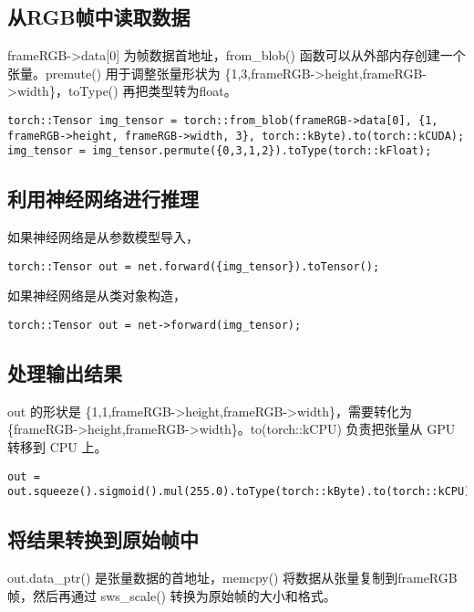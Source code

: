 \subsection{从RGB帧中读取数据}

frameRGB->data[0] 为帧数据首地址，from\_blob() 函数可以从外部内存创建一个张量。premute() 用于调整张量形状为 
\{1,3,frameRGB->height,frameRGB->width\}，toType() 再把类型转为float。

\begin{lstlisting}
torch::Tensor img_tensor = torch::from_blob(frameRGB->data[0], {1, frameRGB->height, frameRGB->width, 3}, torch::kByte).to(torch::kCUDA);
img_tensor = img_tensor.permute({0,3,1,2}).toType(torch::kFloat);
\end{lstlisting}

\subsection{利用神经网络进行推理}

如果神经网络是从参数模型导入，

\begin{lstlisting}
torch::Tensor out = net.forward({img_tensor}).toTensor();
\end{lstlisting}

如果神经网络是从类对象构造，

\begin{lstlisting}
torch::Tensor out = net->forward(img_tensor);
\end{lstlisting}

\subsection{处理输出结果}

out 的形状是 \{1,1,frameRGB->height,frameRGB->width\}，需要转化为 \{frameRGB->height,frameRGB->width\}。to(torch::kCPU) 负责把张量从
GPU 转移到 CPU 上。

\begin{lstlisting}
out = out.squeeze().sigmoid().mul(255.0).toType(torch::kByte).to(torch::kCPU);
\end{lstlisting}

\subsection{将结果转换到原始帧中}

out.data\_ptr() 是张量数据的首地址，memcpy() 将数据从张量复制到frameRGB帧，然后再通过 sws\_scale() 转换为原始帧的大小和格式。

